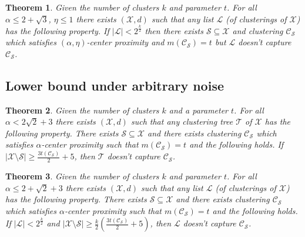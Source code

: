 \documentclass[letterpaper,12pt,titlepage,oneside,final]{book}
\newtheorem{theorem}{Theorem}
\newcommand{\mc}{\mathcal}
\begin{document}
\begin{theorem}
\label{thm:nolistalphacp}
Given the number of clusters $k$ and parameter $t$. For all $\alpha \le 2+\sqrt{3}$, $\eta \le 1$ there exists $(\mc X, d)$ such that any list $\mc L$ (of clusterings of $\mc X$) has  the following property. If $|\mc L| < 2^{\frac{k}{2}}$ then there exists $\mc S \subseteq \mc X$ and clustering $\mc C_{\mc S}$ which satisfies $(\alpha, \eta)$-center proximity and $ m(\mc C_{\mc S}) = t$ but $\mc L$ doesn't capture $\mc C_{\mc S}$.
\end{theorem}

\subsection{Lower bound under arbitrary noise}
\label{section:alphaLowerBoundArbitrary}

\begin{theorem}
\label{thm:nosparsealg}
Given the number of clusters $k$ and a parameter $t$. For all $\alpha < 2\sqrt 2 + 3$ there exists $(\mc X, d)$ such that any clustering tree $\mc T$ of $\mc X$ has the following property. There exists $\mc S \subseteq \mc X$ and there exists clustering $\mc C_{\mc S}$ which satisfies $\alpha$-center proximity such that $m(\mc C_{\mc S}) = t$ and the following holds. If $|\mc X \setminus \mc S| \ge \frac{3t(\mc C_{\mc S})}{2}+5$, then $\mc T$ doesn't capture $\mc C_{\mc S}$.
\end{theorem}

\begin{theorem}
\label{thm:nosparselistalphacp}
Given the number of clusters $k$ and parameter $t$. For all $\alpha \le 2+\sqrt{2}+3$ there exists $(\mc X, d)$ such that any list $\mc L$ (of clusterings of $\mc X$) has  the following property. There exists $\mc S \subseteq \mc X$ and there exists clustering $\mc C_{\mc S}$ which satisfies $\alpha$-center proximity such that $m(\mc C_{\mc S}) = t$ and the following holds. If $|\mc L| < 2^{\frac{k}{2}}$ and $|\mc X \setminus \mc S|\ge \frac{k}{2}(\frac{3t(\mc C_{\mc S})}{2}+5)$, then $\mc L$ doesn't capture $\mc C_{\mc S}$.
\end{theorem}
\end{document}
